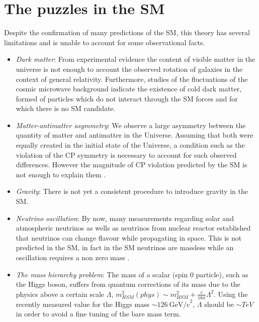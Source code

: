  
 
 
\section{The puzzles in the SM}
\label{SMproblems}
Despite the confirmation of many predictions of the SM, this theory has several limitations and is unable to account for some observational facts.

\begin{itemize}
\item \emph{Dark matter}: From experimental evidence the content of visible matter in the universe is not enough
to account the observed rotation of galaxies \cite{Zwicky:1933gu} in the context of general relativity. 
Furthermore, studies of the fluctuations of the cosmic microwave background indicate the existence of
cold dark matter\cite{Dunkley:2008ie}, formed of particles which do not interact through the SM forces and
for which there is no SM candidate.

\item \emph{Matter-antimatter asymmetry}: We observe a large asymmetry between the quantity of matter and antimatter
in the Universe. Assuming that both were equally created in the initial state of the Universe, a condition such
as the violation of the CP symmetry is necessary to account for such observed differences. However the magnitude of
CP violation predicted by the SM is not enough to explain them \cite{Gavela:1993ts}.

\item \emph{Gravity}: There is not yet a consistent procedure to introduce gravity in the SM.

\item \emph{Neutrino oscillation}: By now, many measurements regarding solar and atmospheric neutrinos as wells as
neutrinos from nuclear reactor established that neutrinos can change flavour while propagating in space.
This is not predicted in the SM, in fact in the SM neutrinos are massless while an oscillation requires a non
zero mass \cite{Maltoni:2011zz}.

\item \emph{The mass hierarchy problem}: The mass of a scalar (spin 0 particle), such as the Higgs boson,
suffers from quantum corrections of its mass due to the physics above a certain scale
$\Lambda$, $m^2_{HSM} (phys) \sim m^2_{HSM} +  \frac{c}{16\pi}\Lambda^2$. Using the recently measured value
for the Higgs mass $\sim 126 ~\mbox{GeV/c}^2$\cite{Filippis:2013ana}, $\Lambda$ should be $\sim TeV$ in order
to avoid a fine tuning of the bare mass term.

\end{itemize}

